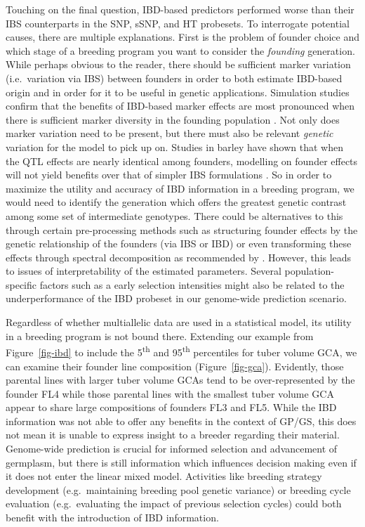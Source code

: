\begin{refsection}
Touching on the final question, IBD-based predictors performed worse
than their IBS counterparts in the SNP, sSNP, and HT probesets. To
interrogate potential causes, there are multiple explanations. First is the problem of founder choice and which stage of
a breeding program you want to consider the \emph{founding} generation.
While perhaps obvious to the reader, there should be sufficient marker
variation (i.e.~variation via IBS) between founders in order to both
estimate IBD-based origin and in order for it to be useful in genetic
applications. Simulation studies confirm that the benefits of IBD-based
marker effects are most pronounced when there is sufficient marker
diversity in the founding population \parencite{ThereseNavarro2022}. Not
only does marker variation need to be present, but there must also be
relevant \emph{genetic} variation for the model to pick up on. Studies
in barley have shown that when the QTL effects are nearly identical
among founders, modelling on founder effects will not yield benefits
over that of simpler IBS formulations \parencite{Maurer2016,Maurer2017}.
So in order to maximize the utility and accuracy of IBD information in a
breeding program, we would need to identify the generation which offers
the greatest genetic contrast among some set of intermediate genotypes.
There could be alternatives to this through certain pre-processing
methods such as structuring founder effects by the genetic relationship
of the founders (via IBS or IBD) or even transforming these effects
through spectral decomposition as recommended by
\parencite{VanEeuwijk2010}. However, this leads to issues of
interpretability of the estimated parameters. Several population-specific factors such as a early selection intensities might also be related to the underperformance of the IBD probeset in
our genome-wide prediction scenario.

Regardless of whether multiallelic data are used in a statistical model,
its utility in a breeding program is not bound there. Extending our example from Figure~\ref{fig-ibd} to include the 5\textsuperscript{th} and 95\textsuperscript{th} percentiles for tuber volume GCA, we can examine their founder line composition (Figure~\ref{fig-gca}).
Evidently, those parental lines with larger tuber volume GCAs tend to
be over-represented by the founder FL4 while those parental lines with
the smallest tuber volume GCA appear to share large compositions of
founders FL3 and FL5. While the IBD information was not able to
offer any benefits in the context of GP/GS, this does not mean it is
unable to express insight to a breeder regarding their material.
Genome-wide prediction is crucial for informed selection and advancement
of germplasm, but there is still information which influences decision
making even if it does not enter the linear mixed model. Activities like breeding strategy development (e.g.~maintaining breeding pool genetic variance) or breeding cycle evaluation (e.g.~evaluating the impact of previous selection cycles) could both benefit with the introduction of IBD information.


\end{refsection}
